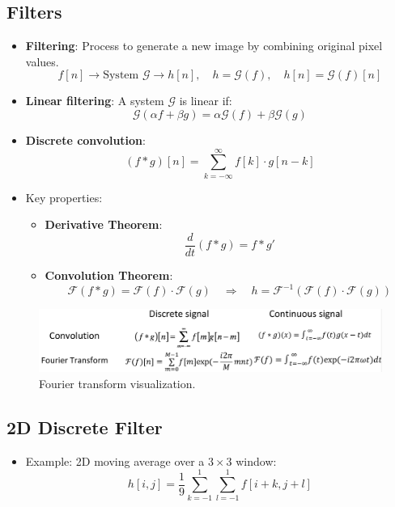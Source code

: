 \clearpage

\subsection{Filters}
\begin{itemize}
    \item \textbf{Filtering}: Process to generate a new image by combining original pixel values.
    $$
    f[n] \rightarrow \text{System } \mathcal{G} \rightarrow h[n], \quad h = \mathcal{G}(f), \quad h[n] = \mathcal{G}(f)[n]
    $$
    \item \textbf{Linear filtering}: A system $ \mathcal{G} $ is linear if:
    $$
    \mathcal{G}(\alpha f + \beta g) = \alpha \mathcal{G}(f) + \beta \mathcal{G}(g)
    $$
    \item \textbf{Discrete convolution}:
    $$
    (f * g)[n] = \sum_{k=-\infty}^{\infty} f[k] \cdot g[n - k]
    $$
    \item Key properties:
    \begin{itemize}
        \item \textbf{Derivative Theorem}: $$\frac{d}{dt}(f * g) = f * g'$$
        \item \textbf{Convolution Theorem}: 
        $$
        \mathcal{F}(f * g) = \mathcal{F}(f) \cdot \mathcal{F}(g) \quad \Rightarrow \quad h = \mathcal{F}^{-1}(\mathcal{F}(f) \cdot \mathcal{F}(g))
        $$
    \end{itemize}
\end{itemize}

\begin{figure}[htbp]
    \centering
    \includegraphics[scale=0.18]{figures/FourierTransform.png}
    \caption{Fourier transform visualization.}
\end{figure}

\clearpage

\subsection{2D Discrete Filter}
\begin{itemize}
    \item Example: 2D moving average over a $ 3 \times 3 $ window:
    $$
    h[i,j] = \frac{1}{9} \sum_{k=-1}^{1} \sum_{l=-1}^{1} f[i+k, j+l]
    $$
\end{itemize}

